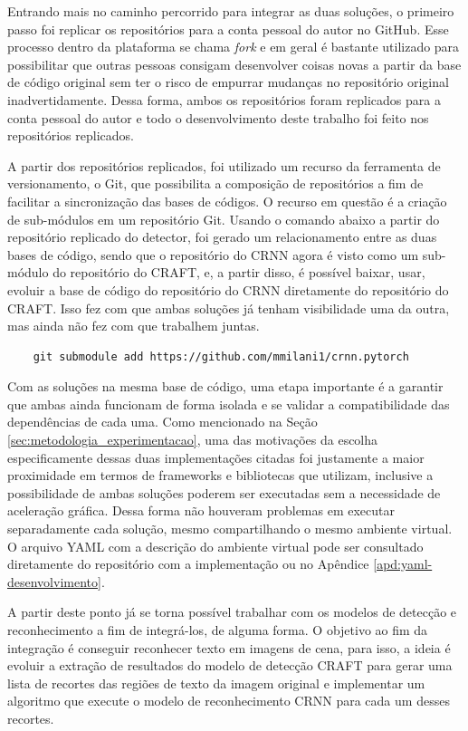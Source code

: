 Entrando mais no caminho percorrido para integrar as duas soluções, o primeiro passo foi replicar os repositórios para a conta pessoal do autor no GitHub. Esse processo dentro da plataforma se chama \textit{fork} e em geral é bastante utilizado para possibilitar que outras pessoas consigam desenvolver coisas novas a partir da base de código original sem ter o risco de empurrar mudanças no repositório original inadvertidamente. Dessa forma, ambos os repositórios foram replicados para a conta pessoal do autor e todo o desenvolvimento deste trabalho foi feito nos repositórios replicados.

A partir dos repositórios replicados, foi utilizado um recurso da ferramenta de versionamento, o Git, que possibilita a composição de repositórios a fim de facilitar a sincronização das bases de códigos. O recurso em questão é a criação de sub-módulos em um repositório Git. Usando o comando abaixo a partir do repositório replicado do detector, foi gerado um relacionamento entre as duas bases de código, sendo que o repositório do CRNN agora é visto como um sub-módulo do repositório do CRAFT, e, a partir disso, é possível baixar, usar, evoluir a base de código do repositório do CRNN diretamente do repositório do CRAFT. Isso fez com que ambas soluções já tenham visibilidade uma da outra, mas ainda não fez com que trabalhem juntas.

\begin{verbatim}
    git submodule add https://github.com/mmilani1/crnn.pytorch
\end{verbatim}

Com as soluções na mesma base de código, uma etapa importante é a garantir que ambas ainda funcionam de forma isolada e se validar a compatibilidade das dependências de cada uma. Como mencionado na Seção \ref{sec:metodologia_experimentacao}, uma das motivações da escolha especificamente dessas duas implementações citadas foi justamente a maior proximidade em termos de frameworks e bibliotecas que utilizam, inclusive a possibilidade de ambas soluções poderem ser executadas sem a necessidade de aceleração gráfica. Dessa forma não houveram problemas em executar separadamente cada solução, mesmo compartilhando o mesmo ambiente virtual. O arquivo YAML com a descrição do ambiente virtual pode ser consultado diretamente do repositório com a implementação ou no Apêndice \ref{apd:yaml-desenvolvimento}.

A partir deste ponto já se torna possível trabalhar com os modelos de detecção e reconhecimento a fim de integrá-los, de alguma forma. O objetivo ao fim da integração é conseguir reconhecer texto em imagens de cena, para isso, a ideia é evoluir a extração de resultados do modelo de detecção CRAFT para gerar uma lista de recortes das regiões de texto da imagem original e implementar um algoritmo que execute o modelo de reconhecimento CRNN para cada um desses recortes.

